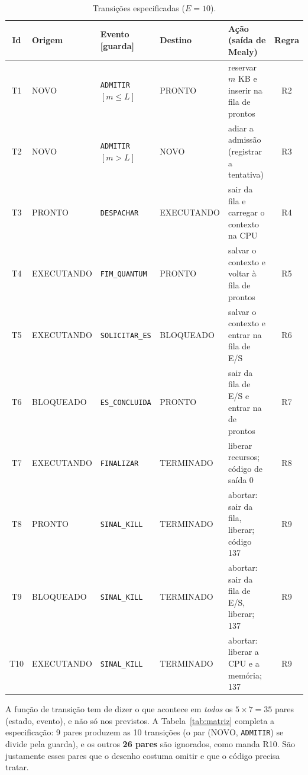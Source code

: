 \documentclass[11pt,a4paper]{article}
\theoremstyle{definition}
\newcommand{\est}[1]{\textsf{\small #1}}   %
\newcommand{\ev}[1]{\texttt{\small #1}}    %
\begin{document}
\begin{table}[H]
\centering\small
\begin{tabularx}{\textwidth}{clllLc}
\toprule
Id & Origem & Evento [guarda] & Destino & Ação (saída de Mealy) & Regra \\
\midrule
T1  & \est{NOVO}       & \ev{ADMITIR} $[m \le L]$ & \est{PRONTO}     & reservar $m$ KB e inserir na fila de prontos & R2 \\
T2  & \est{NOVO}       & \ev{ADMITIR} $[m > L]$   & \est{NOVO}       & adiar a admissão (registrar a tentativa)     & R3 \\
T3  & \est{PRONTO}     & \ev{DESPACHAR}           & \est{EXECUTANDO} & sair da fila e carregar o contexto na CPU    & R4 \\
T4  & \est{EXECUTANDO} & \ev{FIM\_QUANTUM}        & \est{PRONTO}     & salvar o contexto e voltar à fila de prontos & R5 \\
T5  & \est{EXECUTANDO} & \ev{SOLICITAR\_ES}       & \est{BLOQUEADO}  & salvar o contexto e entrar na fila de E/S    & R6 \\
T6  & \est{BLOQUEADO}  & \ev{ES\_CONCLUIDA}       & \est{PRONTO}     & sair da fila de E/S e entrar na de prontos   & R7 \\
T7  & \est{EXECUTANDO} & \ev{FINALIZAR}           & \est{TERMINADO}  & liberar recursos; código de saída 0          & R8 \\
T8  & \est{PRONTO}     & \ev{SINAL\_KILL}         & \est{TERMINADO}  & abortar: sair da fila, liberar; código 137   & R9 \\
T9  & \est{BLOQUEADO}  & \ev{SINAL\_KILL}         & \est{TERMINADO}  & abortar: sair da fila de E/S, liberar; 137   & R9 \\
T10 & \est{EXECUTANDO} & \ev{SINAL\_KILL}         & \est{TERMINADO}  & abortar: liberar a CPU e a memória; 137      & R9 \\
\bottomrule
\end{tabularx}
\caption{Transições especificadas ($E = 10$).}
\label{tab:transicoes}
\end{table}

A função de transição tem de dizer o que acontece em \emph{todos} os $5 \times 7 = 35$ pares
(estado, evento), e não só nos previstos. A Tabela~\ref{tab:matriz} completa a especificação: 9
pares produzem as 10 transições (o par (\est{NOVO}, \ev{ADMITIR}) se divide pela guarda), e os
outros \textbf{26 pares} são ignorados, como manda R10. São justamente esses pares que o desenho
costuma omitir e que o código precisa tratar.
\end{document}
